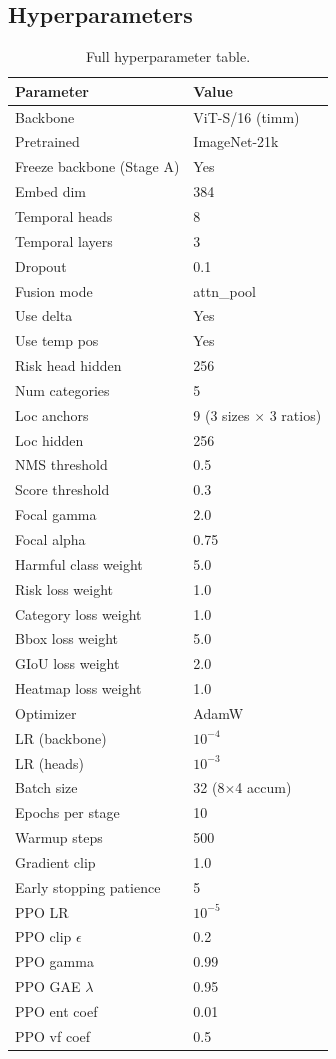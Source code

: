 \documentclass[11pt,a4paper]{article}
\begin{document}
\subsection{Hyperparameters}
\begin{table}[H]
\centering
\caption{Full hyperparameter table.}
\label{tab:hyperparams}
\begin{tabular}{ll}
\toprule
Parameter & Value \\
\midrule
Backbone & ViT-S/16 (timm) \\
Pretrained & ImageNet-21k \\
Freeze backbone (Stage A) & Yes \\
Embed dim & 384 \\
Temporal heads & 8 \\
Temporal layers & 3 \\
Dropout & 0.1 \\
Fusion mode & attn\_pool \\
Use delta & Yes \\
Use temp pos & Yes \\
Risk head hidden & 256 \\
Num categories & 5 \\
Loc anchors & 9 (3 sizes $\times$ 3 ratios) \\
Loc hidden & 256 \\
NMS threshold & 0.5 \\
Score threshold & 0.3 \\
Focal gamma & 2.0 \\
Focal alpha & 0.75 \\
Harmful class weight & 5.0 \\
Risk loss weight & 1.0 \\
Category loss weight & 1.0 \\
Bbox loss weight & 5.0 \\
GIoU loss weight & 2.0 \\
Heatmap loss weight & 1.0 \\
Optimizer & AdamW \\
LR (backbone) & $10^{-4}$ \\
LR (heads) & $10^{-3}$ \\
Batch size & 32 (8$\times$4 accum) \\
Epochs per stage & 10 \\
Warmup steps & 500 \\
Gradient clip & 1.0 \\
Early stopping patience & 5 \\
PPO LR & $10^{-5}$ \\
PPO clip $\epsilon$ & 0.2 \\
PPO gamma & 0.99 \\
PPO GAE $\lambda$ & 0.95 \\
PPO ent coef & 0.01 \\
PPO vf coef & 0.5 \\
\bottomrule
\end{tabular}
\end{table}
\end{document}
